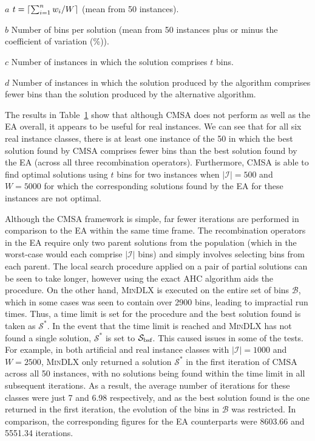 \documentclass{IEEEtran}
\begin{document}
\begin{table}[h!]
\begin{threeparttable}
\begin{tabular}{crrcrrrcrrr}
	\bottomrule
\end{tabular}
\vspace{0.2cm} %
\begin{tablenotes}
	\scriptsize
	\item[$a$] $t = \lceil\sum_{i=1}^{n} w_i / W\rceil$ (mean from 50 instances).
	\item[$b$] Number of bins per solution (mean from 50 instances plus or minus the coefficient of variation (\%)).
	\item[$c$] Number of instances in which the solution comprises $t$ bins.
	\item[$d$] Number of instances in which the solution produced by the algorithm comprises fewer bins than the solution produced by the alternative algorithm.
\end{tablenotes}	
\end{threeparttable}	
\label{table:cmsa}
\end{table}

The results in Table~\ref{table:cmsa} show that although CMSA does not perform as well as the EA overall, it appears to be useful for real instances. We can see that for all six real instance classes, there is at least one instance of the 50 in which the best solution found by CMSA comprises fewer bins than the best solution found by the EA (across all three recombination operators). Furthermore, CMSA is able to find optimal solutions using $t$ bins for two instances when $|\mathcal{I}| = 500$ and $W = 5000$ for which the corresponding solutions found by the EA for these instances are not optimal. 

Although the CMSA framework is simple, far fewer iterations are performed in comparison to the EA within the same time frame. The recombination operators in the EA require only two parent solutions from the population (which in the worst-case would each comprise $|\mathcal{I}|$ bins) and simply involves selecting bins from each parent. The local search procedure applied on a pair of partial solutions can be seen to take longer, however using the exact AHC algorithm aids the procedure. On the other hand, \textsc{MinDLX} is executed on the entire set of bins $\mathcal{B}$, which in some cases was seen to contain over 2900 bins, leading to impractial run times. Thus, a time limit is set for the procedure and the best solution found is taken as $\mathcal{S}^*$. In the event that the time limit is reached and \textsc{MinDLX} has not found a single solution, $\mathcal{S}^*$ is set to $\mathcal{S}_{\textup{bsf}}$. This caused issues in some of the tests. For example, in both artificial and real instance classes with $|\mathcal{I}| = 1000$ and $W =2500$, \textsc{MinDLX} only returned a solution $\mathcal{S}^*$ in the first iteration of CMSA across all 50 instances, with no solutions being found within the time limit in all subsequent iterations. As a result, the average number of iterations for these classes were just 7 and 6.98 respectively, and as the best solution found is the one returned in the first iteration, the evolution of the bins in $\mathcal{B}$ was restricted. In comparison, the corresponding figures for the EA counterparts were 8603.66 and 5551.34 iterations.
\end{document}
